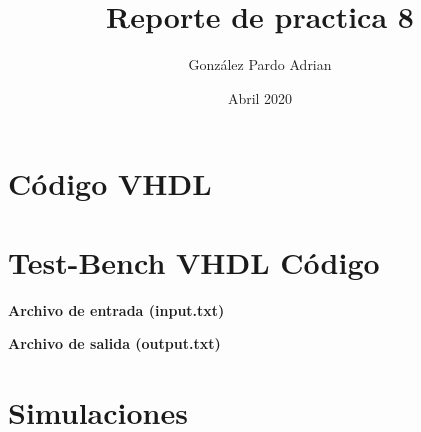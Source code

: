 \documentclass[8pt,executivepaper]{article}
\author{González Pardo Adrian}
\date{Abril 2020}
\title{Reporte de practica 8}
\begin{document}
\maketitle
\section{Código VHDL}

\section{Test-Bench VHDL Código}

\textbf{Archivo de entrada (input.txt)}

\textbf{Archivo de salida (output.txt)}

\section{Simulaciones}
\end{document}

